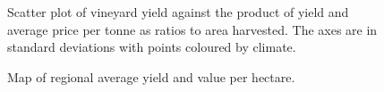 \documentclass[review,12pt,authoryear]{elsarticle}
\begin{document}
\begin{linenumbers}
\begin{figure}
    \caption{Scatter plot of vineyard yield against the product of yield and average price per tonne as ratios to area harvested. The axes are in standard deviations with points coloured by climate.}\label{fig:yield_vs_value_area}
\end{figure}
%
\begin{figure}
  \caption{Map of regional average yield and value per hectare.}\label{fig:map}
\end{figure}
%
%
%


\end{linenumbers}
\end{document}
